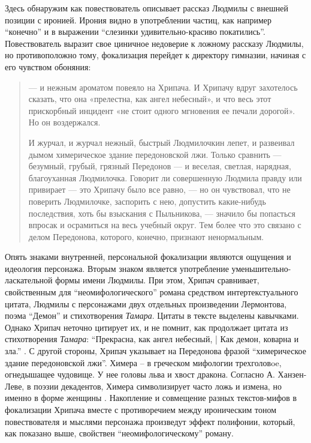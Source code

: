 \documentclass[12pt,a4paper]{article}
\begin{document}
Здесь обнаружим как повествователь описывает рассказ Людмилы с внешней позиции с иронией. Ирония видно в употреблении частиц, как например \enquote{конечно} и в выражении \enquote{слезинки удивительно-красиво покатились}. Повествователь выразит свое циничное недоверие к ложному рассказу Людмилы, но противоположно тому, фокализация перейдет к директору гимназии, начиная с его чувством обоняния:

\begin{quote}

— и нежным ароматом повеяло на Хрипача. И Хрипачу
вдруг захотелось сказать, что она «прелестна, как ангел небесный», и
что весь этот прискорбный инцидент «не стоит одного мгновения ее 
печали дорогой». Но он воздержался.

И журчал, и журчал нежный, быстрый Людмилочкин лепет, и 
развеивал дымом химерическое здание передоновской лжи. Только 
сравнить — безумный, грубый, грязный Передонов — и веселая, светлая,
нарядная, благоуханная Людмилочка. Говорит ли совершенную 
Людмила правду или привирает — это Хрипачу было все равно, — но он 
чувствовал, что не поверить Людмилочке, заспорить с нею, допустить 
какие-нибудь последствия, хоть бы взыскания с Пыльникова, — значило
бы попасться впросак и осрамиться на весь учебный округ. Тем более
что это связано с делом Передонова, которого, конечно, признают 
ненормальным.

\parencite[240.]{sologub2004}
\end{quote}

Опять знаками внутренней, персональной фокализации являются ощущения и идеология персонажа. Вторым знаком является употребление уменьшительно-ласкательной формы имени Людмилы.  При этом, Хрипач сравнивает, свойственным для \enquote{неомифологического} романа средством интертекстуального цитата, Людмилы с персонажами двух отдельных произведении Лермонтова, поэма \enquote{Демон} и стихотворения \emph{Тамара}. Цитаты в тексте выделены кавычками. Однако Хрипач неточно цитирует их, и не помнит, как продолжает цитата из стихотворения \emph{Тамара}: \enquote{Прекрасна, как ангел небесный, | Как демон, коварна и зла.} \parencite[194]{lermontov2000}. С другой стороны, Хрипач указывает на Передонова фразой \enquote{химерическое здание передоновской лжи}. Химера – в греческом мифологии трехголовoe, огнедышащее чудовище. У нее головы льва и хвост дракона. Согласно А. Ханзен-Леве, в поэзии декадентов, Химера символизирует часто ложь и измена, но именно в форме женщины \parencite[200]{hansen-love1999}. Накопление и совмещение разных текстов-мифов в фокализации Хрипача вместе с противоречием между ироническим тоном повествователя и мыслями персонажа произведут эффект полифонии, который, как показано выше, свойствен \enquote{неомифологическому} роману.
\end{document}
